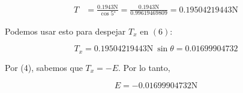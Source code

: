 \documentclass[12pt]{article}
\theoremstyle{definition}
\begin{document}
\begin{align*}
    T &= \frac{0.1943 \text{N}}{\cos \ang{5}} = \frac{0.1943
    \text{N}}{0.99619469809}  = 0.19504219443\text{N}
\end{align*}

Podemos usar esto para despejar $T_x$ en $(6)$: 

\begin{equation*}
    T_x = 0.19504219443\text{N} ~ \sin \theta = 0.01699904732
\end{equation*}

Por (4), sabemos que $T_x = -E$. Por lo tanto, 

\begin{equation}
    E = -0.01699904732\text{N}
\end{equation}
\end{document}

